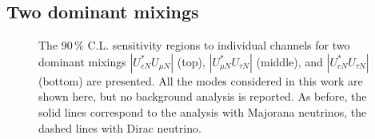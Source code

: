 \subsection{Two dominant mixings}
\label{sec:bimax}

\begin{figure}
	\centering
	{\resizebox{\linewidth}{!}{}}
	\vspace{0.05em}

	{\resizebox{\linewidth}{!}{}}
	\vspace{0.05em}

	{\resizebox{\linewidth}{!}{}}
	\caption[Sensitivity regions to individual channels for two dominant mixings]%
		{The 90\,\% C.L. sensitivity regions to individual channels for two dominant mixings %
		$|U_{e N}^* U_{\mu N}|$ (top), $|U_{\mu N}^* U_{\tau N}|$ (middle), and $|U_{e N}^* U_{\tau N}|$ (bottom) are presented.
		All the modes considered in this work are shown here, but no background analysis is reported.
		As before, the solid lines correspond to the analysis with Majorana neutrinos, the dashed lines with Dirac neutrino.}
	\label{fig:senseMix}
\end{figure}


